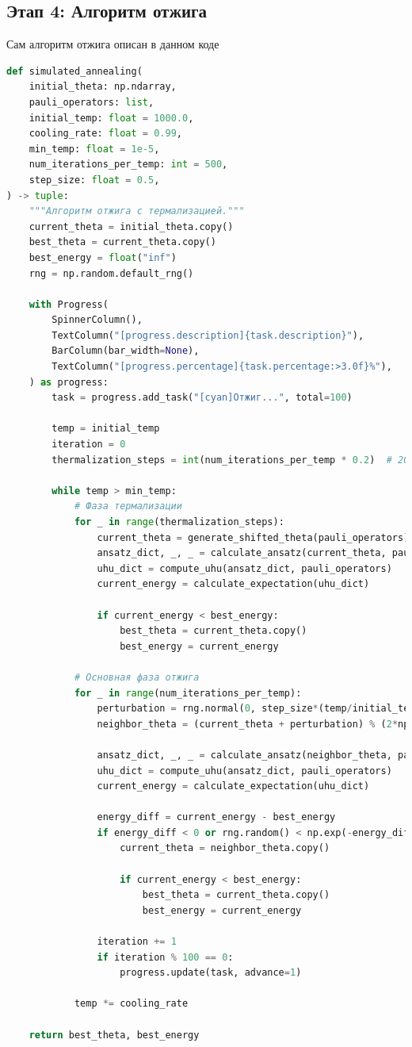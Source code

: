 \documentclass[a4paper]{report}
\begin{document}
\subsection{Этап 4: Алгоритм отжига}
Сам алгоритм отжига описан в данном коде
\begin{lstlisting}[language=Python]
def simulated_annealing(
    initial_theta: np.ndarray,
    pauli_operators: list,
    initial_temp: float = 1000.0,
    cooling_rate: float = 0.99,
    min_temp: float = 1e-5,
    num_iterations_per_temp: int = 500,
    step_size: float = 0.5,
) -> tuple:
    """Алгоритм отжига с термализацией."""
    current_theta = initial_theta.copy()
    best_theta = current_theta.copy()
    best_energy = float("inf")
    rng = np.random.default_rng()

    with Progress(
        SpinnerColumn(),
        TextColumn("[progress.description]{task.description}"),
        BarColumn(bar_width=None),
        TextColumn("[progress.percentage]{task.percentage:>3.0f}%"),
    ) as progress:
        task = progress.add_task("[cyan]Отжиг...", total=100)

        temp = initial_temp
        iteration = 0
        thermalization_steps = int(num_iterations_per_temp * 0.2)  # 20% шагов на термализацию

        while temp > min_temp:
            # Фаза термализации
            for _ in range(thermalization_steps):
                current_theta = generate_shifted_theta(pauli_operators)
                ansatz_dict, _, _ = calculate_ansatz(current_theta, pauli_operators)
                uhu_dict = compute_uhu(ansatz_dict, pauli_operators)
                current_energy = calculate_expectation(uhu_dict)

                if current_energy < best_energy:
                    best_theta = current_theta.copy()
                    best_energy = current_energy

            # Основная фаза отжига
            for _ in range(num_iterations_per_temp):
                perturbation = rng.normal(0, step_size*(temp/initial_temp), current_theta.shape)
                neighbor_theta = (current_theta + perturbation) % (2*np.pi)

                ansatz_dict, _, _ = calculate_ansatz(neighbor_theta, pauli_operators)
                uhu_dict = compute_uhu(ansatz_dict, pauli_operators)
                current_energy = calculate_expectation(uhu_dict)

                energy_diff = current_energy - best_energy
                if energy_diff < 0 or rng.random() < np.exp(-energy_diff / temp):
                    current_theta = neighbor_theta.copy()

                    if current_energy < best_energy:
                        best_theta = current_theta.copy()
                        best_energy = current_energy

                iteration += 1
                if iteration % 100 == 0:
                    progress.update(task, advance=1)

            temp *= cooling_rate

    return best_theta, best_energy
\end{lstlisting}
\end{document}
